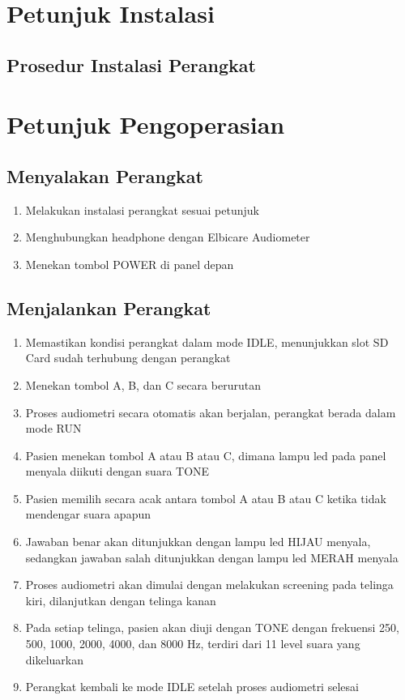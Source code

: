 \documentclass[11pt,a4paper,twoside,onecolumn]{book}
\begin{document}
	\chapter{Petunjuk Instalasi}
		\section{Prosedur Instalasi Perangkat}
	\newpage
	
	\chapter{Petunjuk Pengoperasian}
		\section{Menyalakan Perangkat}
		\begin{enumerate}
			\item Melakukan instalasi perangkat sesuai petunjuk
			\item Menghubungkan headphone dengan Elbicare Audiometer
			\item Menekan tombol POWER di panel depan
		\end{enumerate}
	
		\section{Menjalankan Perangkat}
		\begin{enumerate}
			\item Memastikan kondisi perangkat dalam mode IDLE, menunjukkan slot SD Card sudah terhubung dengan perangkat
			\item Menekan tombol A, B, dan C secara berurutan 
			\item Proses audiometri secara otomatis akan berjalan, perangkat berada dalam mode RUN 
			\item Pasien menekan tombol A atau B atau C, dimana lampu led pada panel menyala diikuti dengan suara TONE
			\item Pasien memilih secara acak antara tombol A atau B atau C ketika tidak mendengar suara apapun
			\item Jawaban benar akan ditunjukkan dengan lampu led HIJAU menyala, sedangkan jawaban salah ditunjukkan dengan lampu led MERAH menyala
			\item Proses audiometri akan dimulai dengan melakukan screening pada telinga kiri, dilanjutkan dengan telinga kanan
			\item Pada setiap telinga, pasien akan diuji dengan TONE dengan frekuensi 250, 500, 1000, 2000, 4000, dan 8000 Hz, terdiri dari 11 level suara yang dikeluarkan
			\item Perangkat kembali ke mode IDLE setelah proses audiometri selesai
		\end{enumerate}
		
\end{document}
